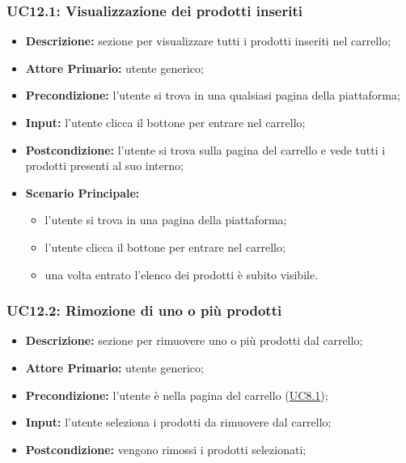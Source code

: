         \subsubsection{UC12.1: Visualizzazione dei prodotti inseriti}
        \label{sec:UC12.1}
        \begin{itemize}
            \item \textbf{Descrizione:} sezione per visualizzare tutti i prodotti inseriti nel carrello;
            \item \textbf{Attore Primario:} utente generico;
            \item \textbf{Precondizione:}  l'utente si trova in una qualsiasi pagina della piattaforma;
            \item \textbf{Input:} l'utente clicca il bottone per entrare nel carrello;
            \item \textbf{Postcondizione:} l'utente si trova sulla pagina del carrello e vede tutti i prodotti presenti al suo interno;
            \item \textbf{Scenario Principale:}
                \begin{itemize}
                    \item l'utente si trova in una pagina della piattaforma;
                    \item l'utente clicca il bottone per entrare nel carrello;
                    \item una volta entrato l'elenco dei prodotti è subito visibile.
                \end{itemize}
        \end{itemize}
        \subsubsection{UC12.2: Rimozione di uno o più prodotti}
        \begin{itemize}
            \item \textbf{Descrizione:} sezione per rimuovere uno o più prodotti dal carrello;
            \item \textbf{Attore Primario:} utente generico;
            \item \textbf{Precondizione:} l'utente è nella pagina del carrello (\hyperref[sec:UC8.1]{\underline{UC8.1}});
            \item \textbf{Input:} l'utente seleziona i prodotti da rimuovere dal carrello;
            \item \textbf{Postcondizione:} vengono rimossi i prodotti selezionati;
        \end{itemize}

